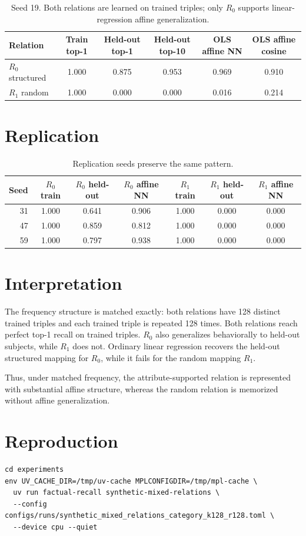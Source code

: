 \documentclass[11pt]{article}
\begin{document}
\begin{table}[h]
\centering
\begin{tabular}{lccccc}
\toprule
Relation & Train top-1 & Held-out top-1 & Held-out top-10 & OLS affine NN & OLS affine cosine \\
\midrule
\(R_0\) structured & 1.000 & 0.875 & 0.953 & 0.969 & 0.910 \\
\(R_1\) random & 1.000 & 0.000 & 0.000 & 0.016 & 0.214 \\
\bottomrule
\end{tabular}
\caption{Seed 19. Both relations are learned on trained triples; only \(R_0\) supports
linear-regression affine generalization.}
\end{table}

\section{Replication}

\begin{table}[h]
\centering
\begin{tabular}{rcccccc}
\toprule
Seed & \(R_0\) train & \(R_0\) held-out & \(R_0\) affine NN &
\(R_1\) train & \(R_1\) held-out & \(R_1\) affine NN \\
\midrule
31 & 1.000 & 0.641 & 0.906 & 1.000 & 0.000 & 0.000 \\
47 & 1.000 & 0.859 & 0.812 & 1.000 & 0.000 & 0.000 \\
59 & 1.000 & 0.797 & 0.938 & 1.000 & 0.000 & 0.000 \\
\bottomrule
\end{tabular}
\caption{Replication seeds preserve the same pattern.}
\end{table}

\section{Interpretation}

The frequency structure is matched exactly: both relations have 128 distinct trained
triples and each trained triple is repeated 128 times. Both relations reach perfect
top-1 recall on trained triples. \(R_0\) also generalizes behaviorally to held-out
subjects, while \(R_1\) does not. Ordinary linear regression recovers the held-out
structured mapping for \(R_0\), while it fails for the random mapping \(R_1\).

Thus, under matched frequency, the attribute-supported relation is represented with
substantial affine structure, whereas the random relation is memorized without affine
generalization.

\section{Reproduction}

\begin{verbatim}
cd experiments
env UV_CACHE_DIR=/tmp/uv-cache MPLCONFIGDIR=/tmp/mpl-cache \
  uv run factual-recall synthetic-mixed-relations \
  --config configs/runs/synthetic_mixed_relations_category_k128_r128.toml \
  --device cpu --quiet
\end{verbatim}
\end{document}
